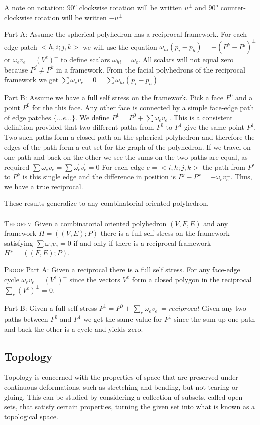 \documentclass[english]{article}
\begin{document}
A note on notation: $90^o$ clockwise rotation will be written $u^\bot$ and $90^o$ counter-clockwise rotation will be written $-u^\bot$

Part A: Assume the spherical polyhedron has a reciprocal framework.
For each edge patch $<h,i;j,k>$ we will use the equation $\omega_{hi}(p_i - p_h) = -(P^k - P^j)^\bot$ or $\omega_ev_e = (V^e)^\bot$ to define scalars $\omega_{hi} = \omega_e$. All scalars will not equal zero because $P^j \neq P^k$ in a framework. From the facial polyhedrons of the reciprocal framework we get $\sum\omega_ev_e = 0 = \sum\omega_{hi}(p_i - p_h)$

Part B: Assume we have a full self stress on the framework.
Pick a face $F^0$ and a point $P^0$ for the this face. Any other face is connected by a simple face-edge path of edge patches $\{...e...\}$. We define $P^1 = P^0 + \sum\omega_ev_e^\bot$. This is a consistent definition provided that two different paths from $F^0$ to $F^1$ give the same point $P^1$. Two such paths form a closed path on the spherical polyhedron and therefore the edges of the path form a cut set for the graph of the polyhedron. If we travel on one path and back on the other we see the sums on the two paths are equal, as required $\sum\omega_ev_e = \sum\omega_e^{'}v_e^{'} = 0$ For each edge $e = <i,h;j,k>$ the path from $P^j$ to $P^k$ is this single edge and the difference in position is $P^j - P^k = -\omega_ev_e^\bot$. Thus, we have a true reciprocal.

These results generalize to any combinatorial oriented polyhedron. \\
\\
\textsc{Theorem} Given a combinatorial oriented polyhedron $(V,F,E)$ and any framework $H = ((V,E);P)$ there is a full self stress on the framework satisfying $\sum \omega_ev_e = 0$ if and only if there is a reciprocal framework $H* = ((F,E);P)$. 

\textsc{Proof} Part A: Given a reciprocal there is a full self stress.
For any face-edge cycle $\omega_e v_e = (V^e)^{\bot}$ since the vectors $V^e$ form a closed polygon in the reciprocal $\sum_e(V^e)^\bot = 0$.

Part B: Given a full self-stress $P^1 = P^0 + \sum_e \omega_ev_e^\bot = reciprocal$
Given any two paths between $F^0$ and $F^1$ we get the same value for $P^1$ since the sum up one path and back the other is a cycle and yields zero.


 
  \subsection{Topology}
 Topology is concerned with the properties of space that are preserved under continuous deformations, such as stretching and bending, but not tearing or gluing. This can be studied by considering a collection of subsets, called open sets, that satisfy certain properties, turning the given set into what is known as a topological space. 
\end{document}
